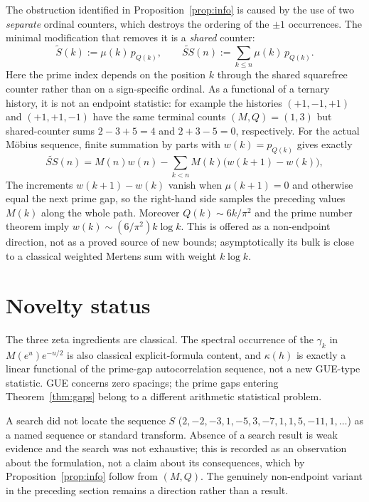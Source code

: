 \documentclass[11pt]{amsart}
\numberwithin{equation}{section}
\theoremstyle{plain}
\theoremstyle{definition}
\theoremstyle{remark}
\newcommand{\mob}{\mu}
\newcommand{\Mert}{M}
\newcommand{\Sq}{Q}
\begin{document}
The obstruction identified in Proposition~\ref{prop:info} is caused by the use
of two \emph{separate} ordinal counters, which destroys the ordering of the
$\pm1$ occurrences. The minimal modification that removes it is a
\emph{shared} counter:
\begin{equation}
\label{eq:shared-counter-definition}
\widetilde S(k):=\mob(k)\,p_{\Sq(k)},
\qquad
\widetilde{SS}(n):=\sum_{k\le n}\mob(k)\,p_{\Sq(k)} .
\end{equation}
Here the prime index depends on the position $k$ through the shared squarefree
counter rather than on a sign-specific ordinal. As a functional of a ternary history,
it is not an endpoint statistic: for example the histories $(+1,-1,+1)$ and
$(+1,+1,-1)$ have the same terminal counts $(M,Q)=(1,3)$ but shared-counter sums
$2-3+5=4$ and $2+3-5=0$, respectively. For the actual M\"obius sequence, finite
summation by parts with $w(k)=p_{\Sq(k)}$ gives exactly
\begin{equation}
\label{eq:abel-shared-counter}
\widetilde{SS}(n)=\Mert(n)w(n)-\sum_{k<n}\Mert(k)\bigl(w(k+1)-w(k)\bigr),
\end{equation}
The increments $w(k+1)-w(k)$ vanish when $\mob(k+1)=0$ and otherwise equal the
next prime gap, so the right-hand side samples the preceding values $M(k)$ along the
whole path. Moreover $Q(k)\sim6k/\pi^2$ and the prime number theorem imply
$w(k)\sim(6/\pi^2)k\log k$. This is offered as a non-endpoint direction, not as
a proved source of new bounds; asymptotically its bulk is close to a classical weighted
Mertens sum with weight $k\log k$.

\section{Novelty status}
\label{sec:novelty}

The three zeta ingredients are classical. The spectral occurrence of the
$\gamma_k$ in $M(e^u)e^{-u/2}$ is also classical explicit-formula content, and
$\kappa(h)$ is exactly a linear functional of the prime-gap autocorrelation
sequence, not a new GUE-type statistic. GUE concerns zero spacings; the prime
gaps entering Theorem~\ref{thm:gaps} belong to a different arithmetic
statistical problem.

A search did not locate the sequence $S$
($2,-2,-3,1,-5,3,-7,1,1,5,-11,1,\dots$) as a named sequence or standard
transform. Absence of a search result is weak evidence and the search was not
exhaustive; this is recorded as an observation about the formulation, not a
claim about its consequences, which by Proposition~\ref{prop:info} follow from
$(\Mert,\Sq)$. The genuinely non-endpoint variant in the preceding section remains a
direction rather than a result.
\end{document}
